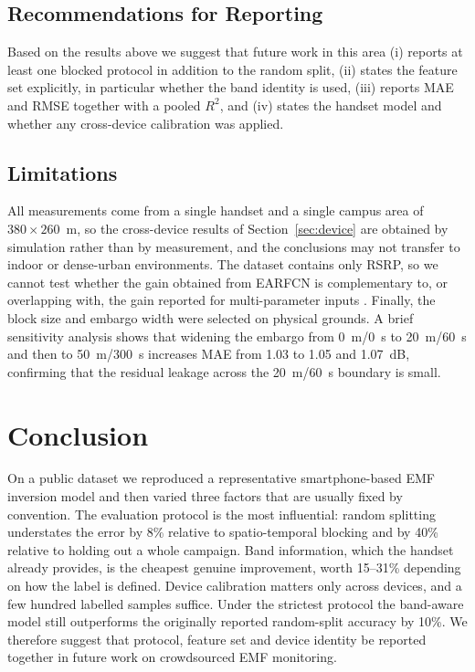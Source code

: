 \documentclass{ieeeaccess}
\begin{document}
\subsection{Recommendations for Reporting}
Based on the results above we suggest that future work in this area (i) reports at
least one blocked protocol in addition to the random split, (ii) states the
feature set explicitly, in particular whether the band identity is used, (iii)
reports MAE and RMSE together with a pooled $R^2$, and (iv) states the handset
model and whether any cross-device calibration was applied.

\subsection{Limitations}
All measurements come from a single handset and a single campus area of
$380\times260$~m, so the cross-device results of Section~\ref{sec:device} are
obtained by simulation rather than by measurement, and the conclusions may not
transfer to indoor or dense-urban environments. The dataset contains only RSRP,
so we cannot test whether the gain obtained from EARFCN is complementary to, or
overlapping with, the gain reported for multi-parameter inputs \cite{huang2026}.
Finally, the block size and embargo width were selected on physical grounds.
A brief sensitivity analysis shows that widening the embargo from
0~m/0~s to 20~m/60~s and then to 50~m/300~s increases MAE from
1.03 to 1.05 and 1.07~dB, confirming that the residual leakage
across the 20~m/60~s boundary is small.

\section{Conclusion}
\label{sec:conclusion}
On a public dataset we reproduced a representative smartphone-based EMF inversion
model and then varied three factors that are usually fixed by convention. The
evaluation protocol is the most influential: random splitting understates the
error by 8\% relative to spatio-temporal blocking and by 40\% relative to holding
out a whole campaign. Band information, which the handset already provides, is the
cheapest genuine improvement, worth 15--31\% depending on how the label is
defined. Device calibration matters only across
devices, and a few hundred labelled samples suffice. Under the strictest protocol
the band-aware model still outperforms the originally reported random-split
accuracy by 10\%. We therefore suggest that protocol, feature set and device
identity be reported together in future work on crowdsourced EMF monitoring.
\end{document}
